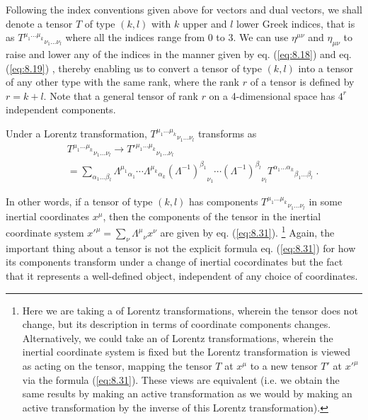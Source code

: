 Following the index conventions given above for vectors and dual vectors, we shall denote a tensor $T$ of type $(k,l)$ with $k$ upper and $l$ lower Greek indices, that is as ${T^{\mu_1\ldots\mu_k}}_{\nu_1\ldots\nu_l}$ where all the indices range from 0 to 3. We can use $\eta^{\mu\nu}$ and $\eta_{\mu\nu}$ to raise and lower any of the indices in the manner given by eq. (\ref{eq:8.18}) and eq. (\ref{eq:8.19}) , thereby enabling us to convert a tensor of type 
$(k,l)$ into a tensor of any other type with the same rank, where the rank $r$ of a tensor is defined by $r = k + l$. Note that a general tensor of rank $r$ on a 4-dimensional space has $4^r$ independent components.

Under a Lorentz transformation, ${T^{\mu_1\ldots\mu_k}}_{\nu_1\ldots\nu_l}$ transforms as
\begin{equation}\label{eq:8.31}
\begin{aligned}
&{T^{\mu_1\ldots\mu_k}}_{\nu_1\ldots\nu_l} \rightarrow {T'^{\mu_1\ldots\mu_k}}_{\nu_1\ldots\nu_l}\\
\quad &= \sum_{\alpha_1\ldots\beta_l} 
{\Lambda^{\mu_1}}_{\alpha_1} \cdots {\Lambda^{\mu_k}}_{\alpha_k}
{(\Lambda^{-1})^{\beta_1}}_{\nu_1} \cdots {(\Lambda^{-1})^{\beta_l}}_{\nu_l}
{T^{\alpha_1\ldots\alpha_k}}_{\beta_1\ldots\beta_l}\;.
\end{aligned}
\end{equation}

In other words, if a tensor of type $(k,l)$ has components ${T^{\mu_1\ldots\mu_k}}_{\nu_1\ldots\nu_l}$ in some inertial 
coordinates $x^\mu$, then the components of the tensor in the inertial coordinate system $x'^\mu = \sum_\nu {\Lambda^\mu}_\nu x^\nu$ are given by eq. (\ref{eq:8.31}).
\footnote{Here we are taking a  of Lorentz transformations, wherein the tensor does not change, but its description in terms of coordinate components changes. Alternatively, we could take an  of Lorentz transformations, wherein the inertial coordinate system is fixed but the Lorentz transformation is viewed as acting on the tensor, mapping the tensor $T$ at $x^\mu$ to a new tensor $T'$ at $x'^\mu$ via the formula (\ref{eq:8.31}). These views are equivalent (i.e. we obtain the same results by making an active transformation as we would by making an active transformation by the inverse of this Lorentz transformation).} 
Again, the important thing about a tensor is not the explicit formula eq. (\ref{eq:8.31}) for how its components transform under a change of inertial cocordinates but the fact that it represents a well-defined object, independent of any choice of coordinates. 

